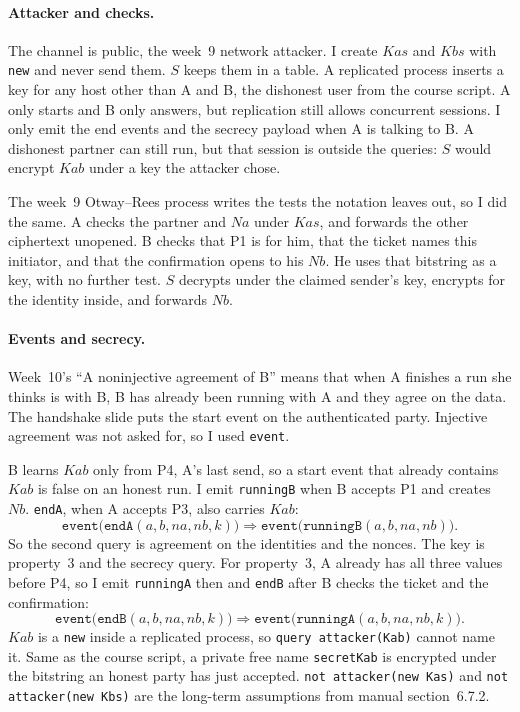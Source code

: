 \documentclass[11pt]{article}
\begin{document}
\paragraph{Attacker and checks.}
The channel is public, the week~9 network attacker. I create $Kas$ and $Kbs$ with \texttt{new} and never send them. $S$ keeps them in a table. A replicated process inserts a key for any host other than A and B, the dishonest user from the course script. A only starts and B only answers, but replication still allows concurrent sessions. I only emit the end events and the secrecy payload when A is talking to B. A dishonest partner can still run, but that session is outside the queries: $S$ would encrypt $Kab$ under a key the attacker chose.

The week~9 Otway--Rees process writes the tests the notation leaves out, so I did the same. A checks the partner and $Na$ under $Kas$, and forwards the other ciphertext unopened. B checks that P1 is for him, that the ticket names this initiator, and that the confirmation opens to his $Nb$. He uses that bitstring as a key, with no further test. $S$ decrypts under the claimed sender's key, encrypts for the identity inside, and forwards $Nb$.

\paragraph{Events and secrecy.}
Week~10's ``A noninjective agreement of B'' means that when A finishes a run she thinks is with B, B has already been running with A and they agree on the data. The handshake slide puts the start event on the authenticated party. Injective agreement was not asked for, so I used \texttt{event}.

B learns $Kab$ only from P4, A's last send, so a start event that already contains $Kab$ is false on an honest run. I emit \texttt{runningB} when B accepts P1 and creates $Nb$. \texttt{endA}, when A accepts P3, also carries $Kab$:
\[
\texttt{event(endA}(a,b,na,nb,k)\texttt{)} \Longrightarrow \texttt{event(runningB}(a,b,na,nb)\texttt{)}.
\]
So the second query is agreement on the identities and the nonces. The key is property~3 and the secrecy query. For property~3, A already has all three values before P4, so I emit \texttt{runningA} then and \texttt{endB} after B checks the ticket and the confirmation:
\[
\texttt{event(endB}(a,b,na,nb,k)\texttt{)} \Longrightarrow \texttt{event(runningA}(a,b,na,nb,k)\texttt{)}.
\]
$Kab$ is a \texttt{new} inside a replicated process, so \texttt{query attacker(Kab)} cannot name it. Same as the course script, a private free name \texttt{secretKab} is encrypted under the bitstring an honest party has just accepted. \texttt{not attacker(new Kas)} and \texttt{not attacker(new Kbs)} are the long-term assumptions from manual section~6.7.2.
\end{document}

